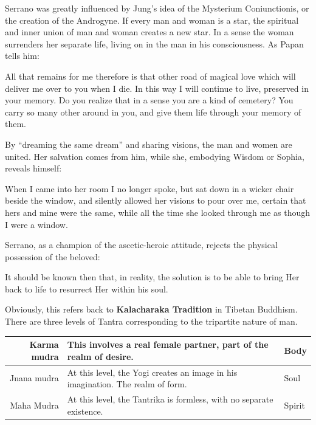Serrano was greatly influenced by Jung's idea of the Mysterium Coniunctionis, or the creation of the Androgyne. If every man and woman is a star, the spiritual and inner union of man and woman creates a new star. In a sense the woman surrenders her separate life, living on in the man in his consciousness. As Papan tells him:

\begin{quotex}
All that remains for me therefore is that other road of magical love which will deliver me over to you when I die. In this way I will continue to live, preserved in your memory. Do you realize that in a sense you are a kind of cemetery? You carry so many other around in you, and give them life through your memory of them.

\end{quotex}
By “dreaming the same dream” and sharing visions, the man and women are united. Her salvation comes from him, while she, embodying Wisdom or Sophia, reveals himself:

\begin{quotex}
When I came into her room I no longer spoke, but sat down in a wicker chair beside the window, and silently allowed her visions to pour over me, certain that hers and mine were the same, while all the time she looked through me as though I were a window.

\end{quotex}
Serrano, as a champion of the ascetic-heroic attitude, rejects the physical possession of the beloved:

\begin{quotex}
It should be known then that, in reality, the solution is to be able to bring Her back to life to resurrect Her within his soul.

\end{quotex}
Obviously, this refers back to \textbf{Kalacharaka Tradition} in Tibetan Buddhism. There are three levels of Tantra corresponding to the tripartite nature of man.

\begin{table}[h]\small\centering
\begin{tabular}{rp{17em}l}
\toprule
Karma mudra &
This involves a real female partner, part of the realm of desire. &
Body\\\midrule
Jnana mudra &
At this level, the Yogi creates an image in his imagination. The realm of form. &
Soul\\\midrule
Maha Mudra &
At this level, the Tantrika is formless, with no separate existence. &
Spirit\\\bottomrule
\end{tabular}
\end{table}

